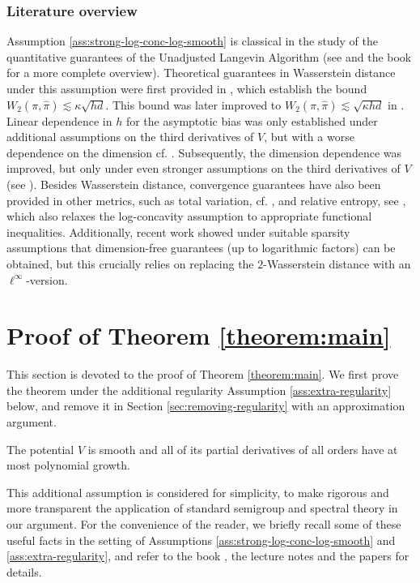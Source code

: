 \documentclass[11pt,a4paper]{article}
\begin{document}
    \subsubsection*{Literature overview}
    Assumption \ref{ass:strong-log-conc-log-smooth} is classical in the study of the quantitative guarantees of the Unadjusted Langevin Algorithm (see \cite{dalalyan2017theoretical,durmus2017nonasymptotic} and the book \cite{Chewi26Book} for a more complete overview). Theoretical guarantees in Wasserstein distance under this assumption were first provided in \cite{durmus2019high,dalalyan2017further}, which establish the bound $W_2(\pi,\hat \pi) \lesssim \kappa\sqrt{hd}$. This bound was later improved to $W_2(\pi,\hat \pi) \lesssim \sqrt{\kappa hd}$ in \cite{durmus2019analysis}.
    Linear dependence in $h$ for the asymptotic bias was only established under additional assumptions on the third derivatives of $V$, but with a worse dependence on the dimension cf. \cite{durmus2019high,dalalyan2019user}. Subsequently, the dimension dependence was improved, but only under even stronger assumptions on the third derivatives of $V$ (see \cite{li2022sqrt,durmus2024asymptotic,dalalyan2026improved}).
    Besides Wasserstein distance, convergence guarantees have also been provided in other metrics, such as total variation, cf. \cite{dalalyan2017theoretical,durmus2017nonasymptotic}, and relative entropy, see \cite{vempala2023rapid,chewi2025analysis}, which also relaxes the log-concavity assumption to appropriate functional inequalities. Additionally, recent work \cite{Che-Che-Nil-Wea-2026} showed under suitable sparsity assumptions that dimension-free guarantees (up to logarithmic factors) can be obtained, but this crucially relies on replacing  the $2$-Wasserstein distance with an $\ell^\infty$-version.
   
    
    
    \section{Proof of Theorem \ref{theorem:main}}
    This section is devoted to the proof of Theorem \ref{theorem:main}. 
    We first prove the theorem under the additional regularity Assumption \ref{ass:extra-regularity} below, and remove it in Section \ref{sec:removing-regularity} with an approximation argument.
    \begin{assumption}\label{ass:extra-regularity}
        The potential $V$ is smooth and all of its partial derivatives of all orders have at most polynomial growth.
    \end{assumption}
    This additional assumption is considered for simplicity, to make rigorous and more transparent the application of standard semigroup and spectral theory in our argument. 
    For the convenience of the reader, we briefly recall some of these useful facts in the setting of Assumptions \ref{ass:strong-log-conc-log-smooth} and \ref{ass:extra-regularity}, and refer to the book \cite{bak-gen-led-2014}, the lecture notes \cite{kla-leh-2025} and the papers \cite{kla-put-2023-spec,kla-2023-log} for details.
    
\end{document}
